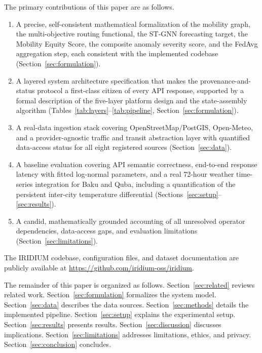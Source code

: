 The primary contributions of this paper are as follows.
\begin{enumerate}
  \item A precise, self-consistent mathematical formalization of the
        mobility graph, the multi-objective routing functional,
        the ST-GNN forecasting target, the Mobility Equity Score,
        the composite anomaly severity score, and the FedAvg aggregation
        step, each consistent with the implemented codebase
        (Section~\ref{sec:formulation}).
  \item A layered system architecture specification that makes the
        provenance-and-status protocol a first-class citizen of
        every API response, supported by a formal description of the
        five-layer platform design and the state-assembly algorithm
        (Tables~\ref{tab:layers}--\ref{tab:pipeline},
        Section~\ref{sec:formulation}).
  \item A real-data ingestion stack covering OpenStreetMap/PostGIS,
        Open-Meteo, and a provider-agnostic traffic and transit
        abstraction layer with quantified data-access status for all
        eight registered sources
        (Section~\ref{sec:data}).
  \item A baseline evaluation covering API semantic correctness,
        end-to-end response latency with fitted log-normal parameters,
        and a real 72-hour weather time-series integration for Baku
        and Quba, including a quantification of the persistent
        inter-city temperature differential
        (Sections~\ref{sec:setup}--\ref{sec:results}).
  \item A candid, mathematically grounded accounting of all unresolved
        operator dependencies, data-access gaps, and evaluation
        limitations (Section~\ref{sec:limitations}).
\end{enumerate}

The IRIDIUM codebase, configuration files, and dataset documentation
are publicly available at
\url{https://github.com/iridium-oss/iridium}.

The remainder of this paper is organized as follows.
Section~\ref{sec:related} reviews related work.
Section~\ref{sec:formulation} formalizes the system model.
Section~\ref{sec:data} describes the data sources.
Section~\ref{sec:methods} details the implemented pipeline.
Section~\ref{sec:setup} explains the experimental setup.
Section~\ref{sec:results} presents results.
Section~\ref{sec:discussion} discusses implications.
Section~\ref{sec:limitations} addresses limitations, ethics, and privacy.
Section~\ref{sec:conclusion} concludes.
